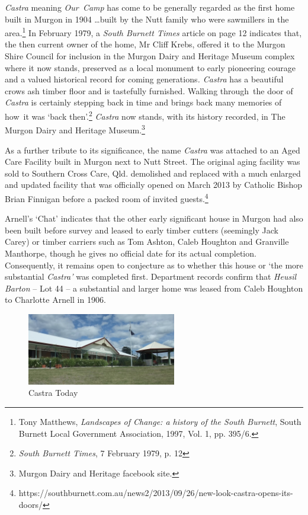 \emph{Castra} meaning \emph{Our~Camp} has come to be generally regarded
as the first home built in Murgon in 1904 \ldots built by the Nutt
family who were sawmillers in the area.\footnote{Tony Matthews,
  \emph{Landscapes of Change: a history of the South Burnett}, South
  Burnett Local Government Association, 1997, Vol. 1, pp. 395/6.} In
February 1979, a \emph{South Burnett Times} article on page 12 indicates
that, the then current owner of the home, Mr Cliff Krebs, offered it to
the Murgon Shire Council for inclusion in the Murgon Dairy and Heritage
Museum complex where it now stands, preserved as a local monument to
early pioneering courage and a valued historical record for coming
generations\emph{. Castra} has a beautiful crows ash timber floor and is
tastefully furnished. Walking through~the door of \emph{Castra} is
certainly stepping back in time and brings back many memories of how~it
was `back then'.\footnote{\emph{South Burnett Times}, 7 February 1979,
  p. 12} \emph{Castra} now stands, with its history recorded, in The
Murgon Dairy and Heritage Museum.\footnote{Murgon Dairy and Heritage
  facebook site.}

As a further tribute to its significance, the name \emph{Castra} was
attached to an Aged Care Facility built in Murgon next to Nutt Street.
The original aging facility was sold to Southern Cross Care, Qld.
demolished and replaced with a much enlarged and updated facility that
was officially opened on March 2013 by Catholic Bishop Brian Finnigan
before a packed room of invited guests.\footnote{https://southburnett.com.au/news2/2013/09/26/new-look-castra-opens-its-doors/}

Arnell's `Chat' indicates that the other early significant house in
Murgon had also been built before survey and leased to early timber
cutters (seemingly Jack Carey) or timber carriers such as Tom Ashton,
Caleb Houghton and Granville Manthorpe, though he gives no official date
for its actual completion. Consequently, it remains open to conjecture
as to whether this house or `the more substantial \emph{Castra'} was
completed first. Department records confirm that \emph{Heusil Barton} --
Lot 44 -- a substantial and larger home was leased from Caleb Houghton
to Charlotte Arnell in 1906.




\begin{figure}
\begin{center}
\includegraphics[width=0.58\textwidth,right]{images/castraToday.png}
\caption{Castra Today}
\end{center}
\end{figure}


